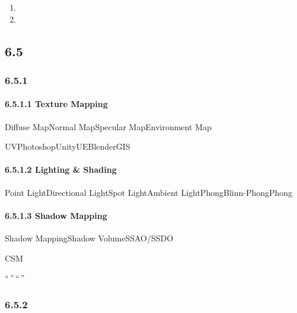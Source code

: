 \begin{enumerate}
\def\labelenumi{\arabic{enumi}.}
\tightlist
\item
\item
\end{enumerate}

\hypertarget{section-107}{%
\subsection{}\label{section-107}}

\hypertarget{section-108}{%
\subsection{6.5}\label{section-108}}

\hypertarget{section-109}{%
\subsubsection{6.5.1}\label{section-109}}

\hypertarget{texture-mapping}{%
\paragraph{6.5.1.1 Texture Mapping}\label{texture-mapping}}

Diffuse MapNormal MapSpecular MapEnvironment Map

UVPhotoshopUnityUEBlenderGIS

\hypertarget{lighting-shading}{%
\paragraph{6.5.1.2 Lighting \& Shading}\label{lighting-shading}}

Point LightDirectional LightSpot LightAmbient LightPhongBlinn-PhongPhong

\hypertarget{shadow-mapping}{%
\paragraph{6.5.1.3 Shadow Mapping}\label{shadow-mapping}}

Shadow MappingShadow VolumeSSAO/SSDO

CSM

``\,''\,``\,''

\hypertarget{section-110}{%
\subsubsection{6.5.2}\label{section-110}}

